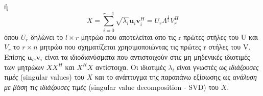 \hspace*{\fill}\newline
ή
\newline\hspace*{\fill}
\begin{equation}
	X = \sum_{i=0}^{r-1} \sqrt{\lambda_{i}} \mathbf{u}_{i}\mathbf{v}_{i}^{H} = U_{r}\Lambda^{\frac{1}{2}}V_{r}^{H}
\end{equation}
\hspace*{\fill}\newline
όπου $U_{r}$ δηλώνει το $l \times r$ μητρώο που αποτελείται απο τις \textlatin{r} πρώτες στήλες του \textlatin{U} και $V_{r}$ το $r \times n$ μητρώο που σχηματίζεται χρησιμοποιώντας τις πρώτες \textlatin{r} στήλες του \textlatin{V}. Επίσης $ \mathbf{u}_{i} $,$ \mathbf{v}_{i} $ είναι τα ιδιοδιανύσματα που αντιστοιχούν στις μη μηδενικές ιδιοτιμές των μητρώων $XX^{H}$ και $X^{H}X$ αντίστοιχα. Οι ιδιοτιμές $ \lambda_{i} $ είναι γνωστές ως \textit{ιδιάζουσες τιμές} \textlatin(singular values) του $X$ και το ανάπτυγμα της παραπάνω εξίσωσης ως \textit{ανάλυση με βάση τις ιδιάζουσες τιμές} \textlatin{(singular value decomposition - SVD)} του $X$.
